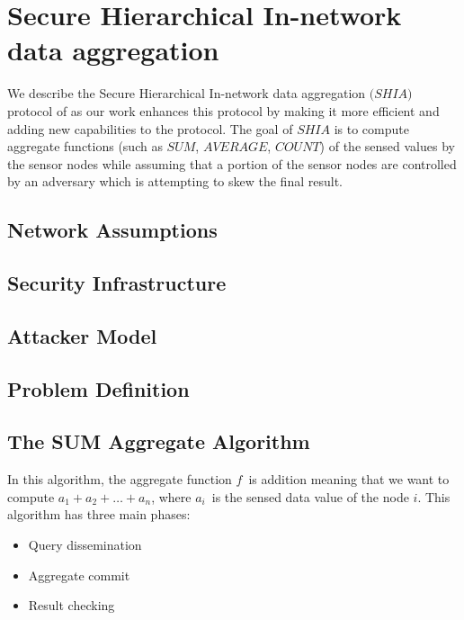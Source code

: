 \chapter{Secure Hierarchical In-network data aggregation} %
\label{cha:Secure Hierarchical In-network data aggregation}

We describe the Secure Hierarchical In-network data aggregation $\textit{(SHIA)}$ protocol of \cite{chan2006secure} as our work enhances this protocol by making it more efficient and adding new capabilities to the protocol. The goal of $\textit{SHIA}$ is to compute aggregate functions (such as $\textit{SUM}$, $\textit{AVERAGE}$, $\textit{COUNT}$) of the sensed values by the sensor nodes while assuming that a portion of the sensor nodes are controlled by an adversary which is attempting to skew the final result.

\section{Network Assumptions}
\section{Security Infrastructure}
\section{Attacker Model}
\section{Problem Definition}
\section{The SUM Aggregate Algorithm}
	In this algorithm, the aggregate function $f$\ is addition meaning that we want to compute $a_{1} + a_{2} + \dotsc + a_{n}$, where $a_{i}$\ is the sensed data value of the node $i$.
	This algorithm has three main phases:
	\begin{itemize}
		\item Query dissemination
		\item Aggregate commit
		\item Result checking
	\end{itemize}

